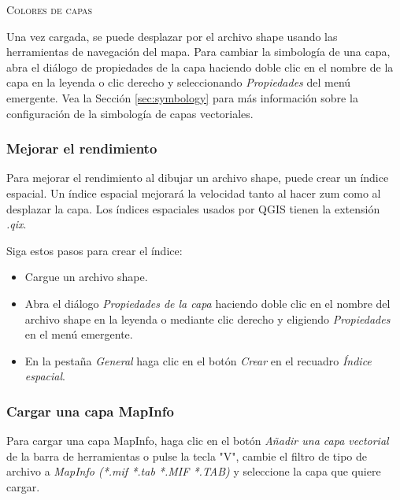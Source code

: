 \begin{Tip}\caption{\textsc{Colores de capas}}
\end{Tip}

Una vez cargada, se puede desplazar por el archivo shape usando las herramientas de navegación del mapa. Para cambiar la simbología de una capa, abra el diálogo de propiedades de la capa haciendo doble clic en el nombre de la capa en la leyenda o clic derecho y seleccionando \textsl{Propiedades} del menú emergente. Vea la Sección \ref{sec:symbology} para más información sobre la configuración de la simbología de capas vectoriales.
  
\subsubsection{Mejorar el rendimiento}

Para mejorar el rendimiento al dibujar un archivo shape, puede crear un índice espacial. Un índice espacial  mejorará la velocidad tanto al hacer zum como al desplazar la capa. Los índices espaciales usados por QGIS tienen la extensión \textsl{.qix}.

Siga estos pasos para crear el índice:

\begin{itemize}
\item Cargue un archivo shape.
\item Abra el diálogo \textit{Propiedades de la capa} haciendo doble clic en el nombre del archivo shape en la leyenda o mediante clic derecho y eligiendo \textit{Propiedades} en el menú emergente.
\item En la pestaña \textit{General} haga clic en el botón \textit{Crear} en el recuadro \textit{Índice espacial}.
\end{itemize}

\subsubsection{Cargar una capa MapInfo}

Para cargar una capa MapInfo, haga clic en el botón \textit{Añadir una capa vectorial} de la barra de herramientas o pulse la tecla "V", cambie el filtro de tipo de archivo a \textit{MapInfo (*.mif *.tab *.MIF *.TAB)} y seleccione la capa que quiere cargar.

